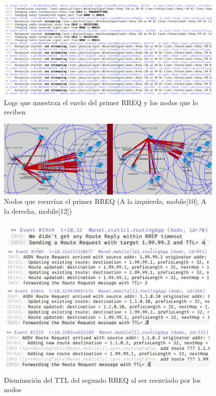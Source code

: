 \begin{figure}[H]
    \centering
    \includegraphics[width=125mm, scale=0.75]{imaxes/ejercicio1_1.png}
    \caption{Logs que muestran el envío del primer RREQ y los nodos que lo reciben}
    \label{fig:primer_rreq_reception}
\end{figure}

\begin{figure}[H]
    \centering
    \includegraphics[width=125mm, scale=0.75]{imaxes/ejercicio1_2.png}
    \caption{Nodos que reenvían el primer RREQ (A la izquierda, mobile[10]; A la derecha, mobile[12])}
    \label{fig:primer_rreq_transmission}
\end{figure}

\begin{figure}[H]
    \centering
    \includegraphics[width=125mm, scale=0.75]{imaxes/ejercicio1_4.jpg}
    \caption{Disminución del TTL del segundo RREQ al ser reenviado por los nodos}
    \label{fig:ttldisminucion}
\end{figure}

